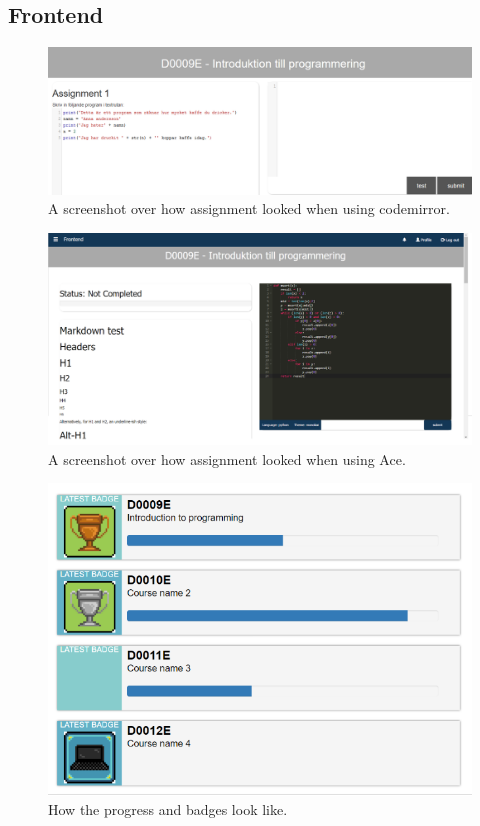 \documentclass[a4paper,12pt]{article}
\begin{document}
\subsection{Frontend}
\begin{figure}[H]
\centering
\includegraphics[scale=0.45]{img/Codemirror_pic.png}
\caption{A screenshot over how assignment looked when using codemirror.}
\end{figure}
\begin{figure}[H]
\centering
\includegraphics[scale=0.5]{img/Ace.png}
\caption{A screenshot over how assignment looked when using Ace. }
\end{figure}
\begin{figure}[H]
\centering
\includegraphics[scale=0.6]{img/Progress.png}
\caption{How the progress and badges look like.}
\end{figure}
\end{document}
